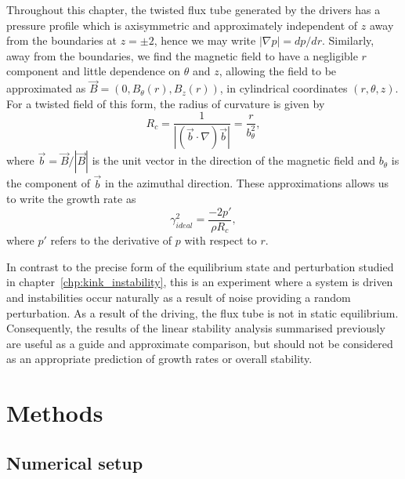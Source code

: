 Throughout this chapter, the twisted flux tube generated by the drivers has a pressure profile which is axisymmetric and approximately independent of $z$ away from the boundaries at $z=\pm2$, hence we may write $|\nabla p| = d p/ dr$. Similarly, away from the boundaries, we find the magnetic field to have a negligible $r$ component and little dependence on $\theta$ and $z$, allowing the field to be approximated as $\vec{B} = (0, B_{\theta}(r), B_z(r))$, in cylindrical coordinates $(r, \theta, z)$. For a twisted field of this form, the radius of curvature is given by 
\begin{equation}
  \label{eq:radius_of_curvature}
  R_c = \frac{1}{|(\vec{b}\cdot\nabla) \vec{b}|} = \frac{r}{b_{\theta}^2},
\end{equation}
where $\vec{b} = \vec{B}/|\vec{B}|$ is the unit vector in the direction of the magnetic field and $b_{\theta}$ is the component of $\vec{b}$ in the azimuthal direction. These approximations allows us to write the growth rate as
\begin{equation}
  \label{eq:fluting_growth_rate2}
\gamma_{ideal}^2 = \frac{-2p'}{\rho R_c},
\end{equation}
where $p'$ refers to the derivative of $p$ with respect to $r$.

In contrast to the precise form of the equilibrium state and perturbation studied in chapter~\ref{chp:kink_instability}, this is an experiment where a system is driven and instabilities occur naturally as a result of noise providing a random perturbation. As a result of the driving, the flux tube is not in static equilibrium. Consequently, the results of the linear stability analysis summarised previously are useful as a guide and approximate comparison, but should not be considered as an appropriate prediction of growth rates or overall stability.

\section{Methods}

\subsection{Numerical setup}

